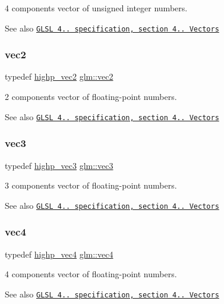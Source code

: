 4 components vector of unsigned integer numbers.

\begin{DoxySeeAlso}{See also}
\href{http://www.opengl.org/registry/doc/GLSLangSpec.4.20.8.pdf}{\tt G\+L\+SL 4.. specification, section 4.. Vectors} 
\end{DoxySeeAlso}
\mbox{\label{group__core__types_gaa1618f51db67eaa145db101d8c8431d8}} 
\subsubsection{\texorpdfstring{vec2}{vec2}}
{\footnotesize\ttfamily typedef \mbox{\hyperlink{group__core__precision_gad588ab946806864499d6559c186ce3ba}{highp\+\_\+vec2}} \mbox{\hyperlink{group__core__types_gaa1618f51db67eaa145db101d8c8431d8}{glm\+::vec2}}}

2 components vector of floating-\/point numbers.

\begin{DoxySeeAlso}{See also}
\href{http://www.opengl.org/registry/doc/GLSLangSpec.4.20.8.pdf}{\tt G\+L\+SL 4.. specification, section 4.. Vectors} 
\end{DoxySeeAlso}
\mbox{\label{group__core__types_ga1c47e8b3386109bc992b6c48e91b0be7}} 
\subsubsection{\texorpdfstring{vec3}{vec3}}
{\footnotesize\ttfamily typedef \mbox{\hyperlink{group__core__precision_ga37ff190d92f9be26223a5de4153b9133}{highp\+\_\+vec3}} \mbox{\hyperlink{group__core__types_ga1c47e8b3386109bc992b6c48e91b0be7}{glm\+::vec3}}}

3 components vector of floating-\/point numbers.

\begin{DoxySeeAlso}{See also}
\href{http://www.opengl.org/registry/doc/GLSLangSpec.4.20.8.pdf}{\tt G\+L\+SL 4.. specification, section 4.. Vectors} 
\end{DoxySeeAlso}
\mbox{\label{group__core__types_ga5881b1b022d7fd1b7218f5916532dd02}} 
\subsubsection{\texorpdfstring{vec4}{vec4}}
{\footnotesize\ttfamily typedef \mbox{\hyperlink{group__core__precision_ga27638826fa491205403b39198c49e9f5}{highp\+\_\+vec4}} \mbox{\hyperlink{group__core__types_ga5881b1b022d7fd1b7218f5916532dd02}{glm\+::vec4}}}

4 components vector of floating-\/point numbers.

\begin{DoxySeeAlso}{See also}
\href{http://www.opengl.org/registry/doc/GLSLangSpec.4.20.8.pdf}{\tt G\+L\+SL 4.. specification, section 4.. Vectors} 
\end{DoxySeeAlso}
